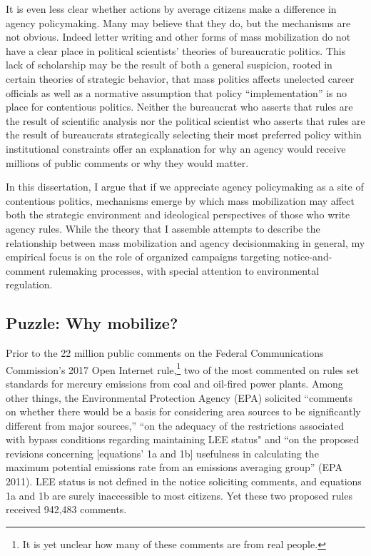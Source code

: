 It is even less clear whether actions by average citizens make a difference in agency policymaking. Many may believe that they do, but the mechanisms are not obvious. Indeed letter writing and other forms of mass mobilization do not have a clear place in political scientists' theories of bureaucratic politics. This lack of scholarship may be the result of both a general suspicion, rooted in certain theories of strategic behavior, that mass politics affects unelected career officials as well as a normative assumption that policy ``implementation'' is no place for contentious politics. Neither the bureaucrat who asserts that rules are the result of scientific analysis nor the political scientist who asserts that rules are the result of bureaucrats strategically selecting their most preferred policy within institutional constraints offer an explanation for why an agency would receive millions of public comments or why they would matter.

In this 
dissertation,
I argue that if we appreciate agency policymaking as a site of contentious politics, mechanisms emerge by which mass mobilization may affect both the strategic environment and ideological perspectives of those who write agency rules. While the theory that I assemble attempts to describe the relationship between mass mobilization and agency decisionmaking in general, my empirical focus is on the role of  organized campaigns targeting notice-and-comment rulemaking processes, with special attention to environmental 
regulation.



 \subsection{Puzzle: Why mobilize?}

Prior to the 22 million public comments on the Federal Communications Commission's 2017 Open Internet rule,\footnote{It is yet unclear how many of these comments are from real people.} two of the most commented on rules set standards for mercury emissions from coal and oil-fired power plants. Among other things, the Environmental Protection Agency (EPA) solicited ``comments on whether there would be a basis for considering area sources to be significantly different from major sources,'' ``on the adequacy of the restrictions associated with bypass conditions regarding maintaining LEE status" and ``on the proposed revisions concerning [equations' 1a and 1b] usefulness in calculating the maximum potential emissions rate from an emissions averaging group'' (EPA 2011). LEE status is not defined in the notice soliciting comments, and equations 1a and 1b are surely inaccessible to most citizens. Yet these two proposed rules received 942,483 comments. 

